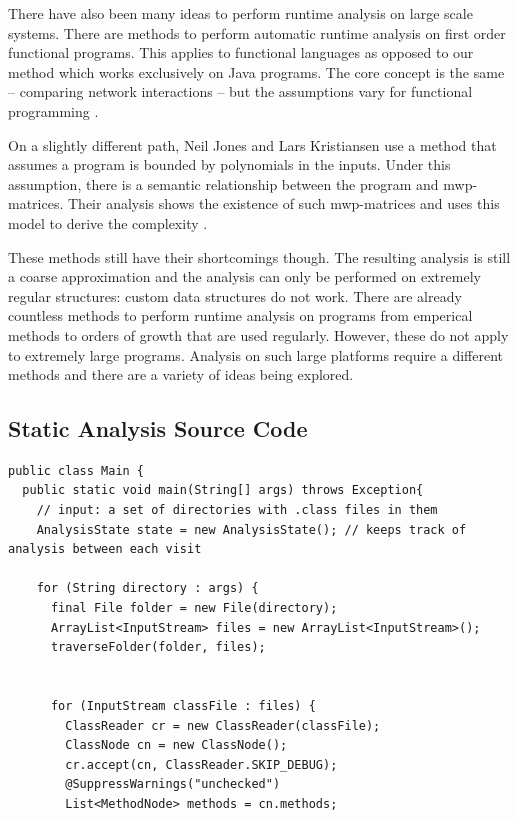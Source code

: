 \documentclass[11pt,a4paper,twocolumn]{article}
\begin{document}
\begin{singlespace}
There have also been many ideas to perform runtime analysis on large scale systems.
There are methods to perform automatic runtime analysis on first order
functional programs. This applies to functional languages as opposed to our
method which works exclusively on Java programs. The core concept is the same --
comparing network interactions -- but the assumptions vary for functional
programming \cite{Frederiksen02automaticruntime}.

On a slightly different path, Neil Jones and Lars Kristiansen use a method that
assumes a program is bounded by polynomials in the inputs. Under this assumption,
there is a semantic relationship between the program and mwp-matrices. Their
analysis shows the existence of such mwp-matrices and uses this model to derive
the complexity \cite{Jones_aflow}.

These methods still have their shortcomings though. The resulting analysis is
still a coarse approximation and the analysis can only be performed on extremely
regular structures: custom data structures do not work. There are already
countless methods to perform runtime analysis on programs from emperical methods
to orders of growth that are used regularly. However, these do not apply to
extremely large programs. Analysis on such large platforms require a different
methods and there are a variety of ideas being explored.


\printbibliography[title={References}]

\onecolumn
\begin{appendices}
\section{Static Analysis Source Code}
\begin{lstlisting}[caption={Main.java}]
public class Main {
  public static void main(String[] args) throws Exception{
    // input: a set of directories with .class files in them
    AnalysisState state = new AnalysisState(); // keeps track of analysis between each visit

    for (String directory : args) {
      final File folder = new File(directory);
      ArrayList<InputStream> files = new ArrayList<InputStream>();
      traverseFolder(folder, files);


      for (InputStream classFile : files) {
        ClassReader cr = new ClassReader(classFile);
        ClassNode cn = new ClassNode();
        cr.accept(cn, ClassReader.SKIP_DEBUG);
        @SuppressWarnings("unchecked")
        List<MethodNode> methods = cn.methods;


\end{lstlisting}
\end{appendices}
\end{singlespace}
\end{document}
